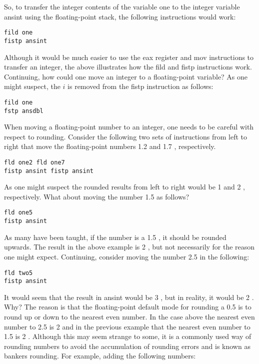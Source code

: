 \documentclass[10pt]{article}
\begin{document}
So, to transfer the integer contents of the variable one to the integer variable ansint using the floating-point stack, the following instructions would work:

\begin{verbatim}
fild one
fistp ansint
\end{verbatim}

Although it would be much easier to use the eax register and mov instructions to transfer an integer, the above illustrates how the fild and fistp instructions work. Continuing, how could one move an integer to a floating-point variable? As one might suspect, the $i$ is removed from the fistp instruction as follows:

\begin{verbatim}
fild one
fstp ansdbl
\end{verbatim}

When moving a floating-point number to an integer, one needs to be careful with respect to rounding. Consider the following two sets of instructions from left to right that move the floating-point numbers 1.2 and 1.7 , respectively.

\begin{verbatim}
fld one2 fld one7
fistp ansint fistp ansint
\end{verbatim}

As one might suspect the rounded results from left to right would be 1 and 2 , respectively. What about moving the number 1.5 as follows?

\begin{verbatim}
fld one5
fistp ansint
\end{verbatim}

As many have been taught, if the number is a 1.5 , it should be rounded upwards. The result in the above example is 2 , but not necessarily for the reason one might expect. Continuing, consider moving the number 2.5 in the following:

\begin{verbatim}
fld two5
fistp ansint
\end{verbatim}

It would seem that the result in ansint would be 3 , but in reality, it would be 2 . Why? The reason is that the floating-point default mode for rounding a 0.5 is to round up or down to the nearest even number. In the case above the nearest even number to 2.5 is 2 and in the previous example that the nearest even number to 1.5 is 2 . Although this may seem strange to some, it is a commonly used way of rounding numbers to avoid the accumulation of rounding errors and is known as bankers rounding. For example, adding the following numbers:
\end{document}
